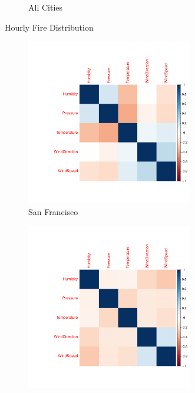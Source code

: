 \documentclass[10pt]{article}
\begin{document}
\begin{figure}[H]
\begin{subfigure}[t]{0.3\textwidth}
        \caption{All Cities}
    \end{subfigure}
    \caption{Hourly Fire Distribution}
\end{figure}

\begin{figure}[H]
    \centering
    \begin{subfigure}[t]{0.3\textwidth}
        \centering
        \includegraphics[width=0.8\textwidth]{../plot/corr_sf.pdf}
        \caption{San Francisco}
    \end{subfigure}
    \begin{subfigure}[t]{0.3\textwidth}
        \centering
        \includegraphics[width=0.8\textwidth]{../plot/corr_ny.pdf}

\end{subfigure}
\end{figure}
\end{document}
